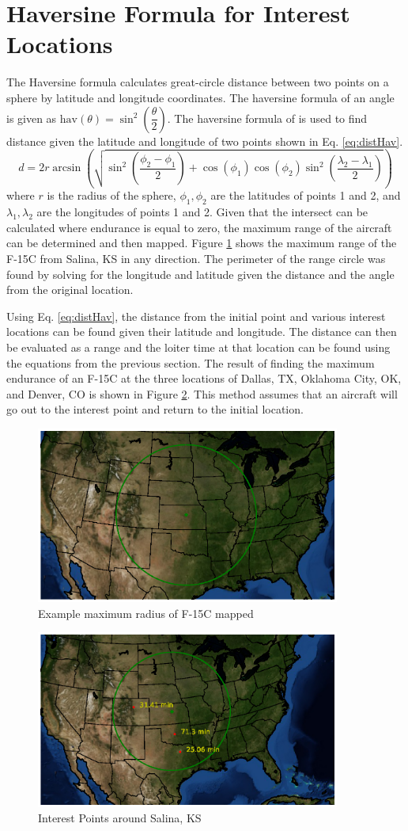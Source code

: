 \section{Haversine Formula for Interest Locations}
The Haversine formula calculates great-circle distance between two points on a sphere by latitude and longitude coordinates. The haversine formula of an angle is given as $\text{hav}(\theta) = \sin^2\left(\dfrac{\theta}{2}\right)$. The haversine formula of is used to find distance given the latitude and longitude of two points shown in Eq. \ref{eq:distHav}. 
\begin{equation}
    d = 2r\arcsin\left(\sqrt{\sin^2\left(\dfrac{\phi_2-\phi_1}{2}\right)+\cos(\phi_1)\cos(\phi_2)\sin^2\left(\dfrac{\lambda_2-\lambda_1}{2}\right)}\right)
    \label{eq:distHav}
\end{equation}
where $r$ is the radius of the sphere, $\phi_1,\phi_2$ are the latitudes of points 1 and 2, and $\lambda_1,\lambda_2$ are the longitudes of points 1 and 2. Given that the intersect can be calculated where endurance is equal to zero, the maximum range of the aircraft can be determined and then mapped. Figure \ref{fig:maxRadius} shows the maximum range of the F-15C from Salina, KS in any direction. The perimeter of the range circle was found by solving for the longitude and latitude given the distance and the angle from the original location. \par
Using Eq. \ref{eq:distHav}, the distance from the initial point and various interest locations can be found given their latitude and longitude. The distance can then be evaluated as a range and the loiter time at that location can be found using the equations from the previous section. The result of finding the maximum endurance of an F-15C at the three locations of Dallas, TX, Oklahoma City, OK, and Denver, CO is shown in Figure \ref{fig:intPtsMap}. This method assumes that an aircraft will go out to the interest point and return to the initial location.
\begin{figure}
    \centering
    \includegraphics[width = 10cm]{Thesis/Method/RadiusEx.eps}
    \caption{Example maximum radius of F-15C mapped}
    \label{fig:maxRadius}
\end{figure}
\begin{figure}
    \centering
    \includegraphics[width = 10cm]{Thesis/Method/IntPtsFigure.eps}
    \caption{Interest Points around Salina, KS}
    \label{fig:intPtsMap}
\end{figure}

